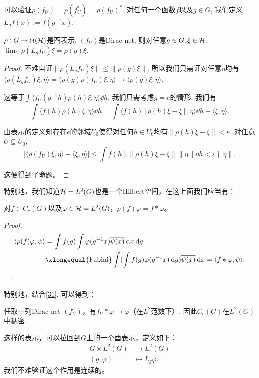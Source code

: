 可以验证$\rho(f_U) = \rho(f_U^*) = \rho(f_U)^*$. 对任何一个函数$f$以及$g \in G$, 我们定义$L_gf(x) := f(g^{-1}x)$.
\begin{lemma}\label{31}
    $\rho:G \to \mathcal{U}(\mathcal{H})$是酉表示, $(f_U)$是Dirac net, 则对任意$g \in G,\xi \in \mathcal{H}$, $\lim_U \rho(L_gf_U)\xi = \rho(g)\xi$.
\end{lemma}
\begin{proof}
    不难自证$\|\rho(L_gf_U)\xi\|\leqslant \|\rho(g)\xi\|$. 所以我们只需证对任意$\eta$均有$\langle \rho(L_gf_U)\xi,\eta \rangle  = \langle \rho(g)\rho(f_U)\xi,\eta \rangle\to \langle \rho(g)\xi,\eta\rangle$.

    这等于$\displaystyle \int \langle f_U(g^{-1}h)\rho(h)\xi,\eta\rangle \dd h$. 我们只需考虑$g = e$的情形. 我们有
    \[\int \langle f(h)\rho(h)\xi,\eta \rangle \dd h 
    = \int \langle f(h)[\rho(h)\xi-\xi],\eta \rangle \dd h 
    + \langle \xi,\eta \rangle.\]

    由表示的定义知存在$e$的邻域$U_0$使得对任何$h \in U_0$均有$\|\rho(h)\xi-\xi\| < \varepsilon$. 对任意$U \subseteq U_0$, 
    \[|\langle \rho(f_U)\xi,\eta \rangle - \langle \xi,\eta \rangle| 
    \leqslant \int f(h)\|\rho(h)\xi - \xi\|\|\eta\| \dd h < \varepsilon \|\eta\|.\]

    这便得到了命题。
\end{proof}
特别地，我们知道$\mathcal{H} = L^2(G)$也是一个Hilbert空间，在这上面我们应当有：
\begin{proposition}
    对$f \in C_c(G)$以及$\varphi \in \mathcal{H} = L^2(G)$，$\rho(f)\varphi = f * \varphi$。
\end{proposition}
\begin{proof}
    \begin{align*}
        \langle \rho(f)\varphi,\psi\rangle &= \int f(g)\int \varphi(g^{-1}x)\overline{\psi(x)} \dd x\dd g \\
        &\xlongequal{\text{Fubini}} \int(\int f(g)\varphi(g^{-1}x)\dd g) \overline{\psi(x)} \dd x = \langle f*\varphi, \psi \rangle.
    \end{align*}
\end{proof}
特别地，结合\ref{31}, 可以得到：
\begin{corollary}
    任取一列Dirac net $(f_U)$，有$f_U * \varphi \to \varphi$（在$L^2$范数下）, 
    因此$C_c(G)$在$L^2(G)$中稠密.
\end{corollary}
这样的表示，可以拉回到$G$上的一个酉表示，定义如下：
\begin{align*}
    G \times L^2(G) & \to L^2(G) \\ (g,\varphi) & \mapsto L_g\varphi.
\end{align*}
我们不难验证这个作用是连续的。

